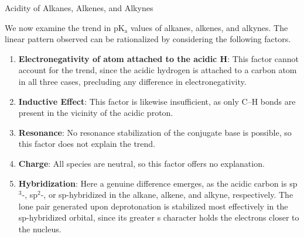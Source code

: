    \begin{core}{Acidity of Alkanes, Alkenes, and Alkynes}

      We now examine the trend in pK$_\text{a}$ values of alkanes, alkenes, and alkynes. The linear pattern observed can be rationalized by considering the following factors.


      \begin{enumerate}

        \item \textbf{Electronegativity of atom attached to the acidic H}: This factor cannot account for the trend, since the acidic hydrogen is attached to a carbon atom in all three cases, precluding any difference in electronegativity.

        \item \textbf{Inductive Effect}: This factor is likewise insufficient, as only C--H bonds are present in the vicinity of the acidic proton.

        \item \textbf{Resonance}: No resonance stabilization of the conjugate base is possible, so this factor does not explain the trend.

        \item \textbf{Charge}: All species are neutral, so this factor offers no explanation.

        \item \textbf{Hybridization}: Here a genuine difference emerges, as the acidic carbon is sp$^3$-, sp$^2$-, or sp-hybridized in the alkane, alkene, and alkyne, respectively. The lone pair generated upon deprotonation is stabilized most effectively in the sp-hybridized orbital, since its greater s character holds the electrons closer to the nucleus.


\end{enumerate}
\end{core}
